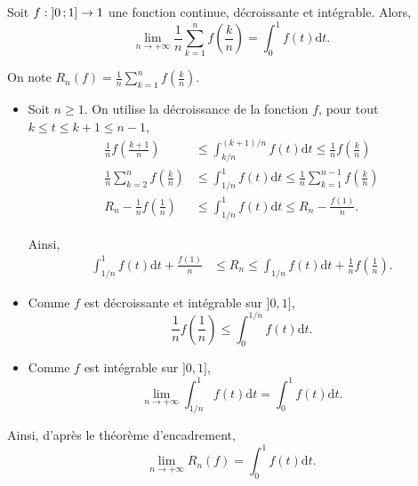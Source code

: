 


\begin{exercice}
    Soit $f : \left]0\,;1\right] \to 1$ une fonction continue, décroissante et intégrable. Alors,
    \[
    \lim\limits_{n \to +\infty} \frac{1}{n} \sum\limits_{k=1}^n f\left(\frac{k}{n}\right) = \displaystyle\int_0^1 f(t) \mathrm{d}t.
    \]
\end{exercice}

\todoinline{Ajouter une illustration avec une fonction type Riemann $x \mapsto \frac{1}{\sqrt{x}}$ sur $]0, 1]$ ?}

\begin{elem_sol}
On note $R_n(f) = \frac{1}{n} \sum\limits_{k=1}^n f\left(\frac{k}{n}\right)$.
\begin{itemize}
\item Soit $n \geq 1$. On utilise la décroissance de la fonction $f$, pour tout $k \leq t \leq k + 1 \leq n-1$,
\begin{align*}
\frac{1}{n} f\left(\frac{k+1}{n}\right) &\leq \displaystyle\int_{k/n}^{(k+1)/n} f(t) \mathrm{d}t \leq \frac{1}{n} f\left(\frac{k}{n}\right)\\
\frac{1}{n} \sum\limits_{k=2}^{n} f\left(\frac{k}{n}\right) &\leq \displaystyle\int_{1/n}^1 f(t) \mathrm{d}t \leq \frac{1}{n} \sum\limits_{k=1}^{n-1} f\left(\frac{k}{n}\right)\\
R_n - \frac{1}{n} f\left(\frac{1}{n}\right) &\leq \displaystyle\int_{1/n}^1 f(t) \mathrm{d}t \leq R_n - \frac{f(1)}{n}.
\end{align*}

Ainsi,
\begin{align*}
\displaystyle\int_{1/n}^1 f(t) \mathrm{d}t + \frac{f(1)}{n} &\leq R_n \leq \displaystyle\int_{1/n} f(t) \mathrm{d}t + \frac{1}{n}  f\left(\frac{1}{n}\right).
\end{align*}

\item Comme $f$ est décroissante et intégrable sur $]0, 1]$,
\[
\frac{1}{n} f\left(\frac{1}{n}\right) \leq \displaystyle\int_0^{1/n} f(t) \mathrm{d}t.
\]

\item Comme $f$ est intégrable sur $]0, 1]$,
\[
\lim\limits_{n\to+\infty} \displaystyle\int_{1/n}^1 f(t) \mathrm{d}t = \displaystyle\int_0^1 f(t) \mathrm{d}t.
\]
\end{itemize}

Ainsi, d'après le théorème d'encadrement,
\[
\lim\limits_{n\to+\infty} R_n(f) = \displaystyle\int_0^1 f(t) \mathrm{d}t.
\]
\end{elem_sol}

